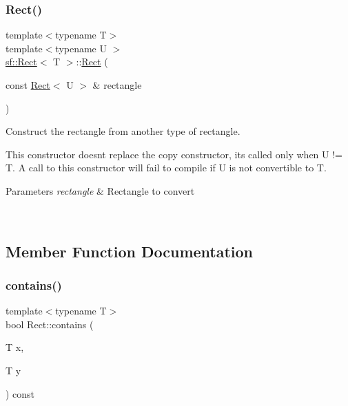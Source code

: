 \subsubsection{\texorpdfstring{Rect()}{Rect()}\hspace{0.1cm}{\footnotesize\ttfamily [4/4]}}
{\footnotesize\ttfamily template$<$typename T$>$ \\
template$<$typename U $>$ \\
\mbox{\hyperlink{classsf_1_1_rect}{sf\+::\+Rect}}$<$ T $>$\+::\mbox{\hyperlink{classsf_1_1_rect}{Rect}} (\begin{DoxyParamCaption}\item[{const \mbox{\hyperlink{classsf_1_1_rect}{Rect}}$<$ U $>$ \&}]{rectangle }\end{DoxyParamCaption})\hspace{0.3cm}{\ttfamily [explicit]}}



Construct the rectangle from another type of rectangle. 

This constructor doesn\textquotesingle{}t replace the copy constructor, it\textquotesingle{}s called only when U != T. A call to this constructor will fail to compile if U is not convertible to T.


\begin{DoxyParams}{Parameters}
{\em rectangle} & Rectangle to convert \begin{DoxyVerb}\end{DoxyVerb}
 \\
\hline
\end{DoxyParams}


\subsection{Member Function Documentation}
\mbox{\label{classsf_1_1_rect_a1d8a4a3aecec18310f6e3e23db43dfb8}} 
\subsubsection{\texorpdfstring{contains()}{contains()}\hspace{0.1cm}{\footnotesize\ttfamily [1/2]}}
{\footnotesize\ttfamily template$<$typename T$>$ \\
bool Rect\+::contains (\begin{DoxyParamCaption}\item[{T}]{x,  }\item[{T}]{y }\end{DoxyParamCaption}) const}



